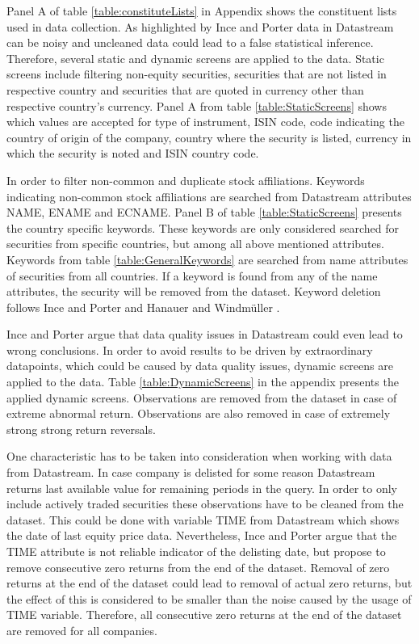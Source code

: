 \documentclass{article}
\begin{document}
Panel A of table \ref{table:constituteLists} in Appendix shows the constituent lists used in data collection. As highlighted by Ince and Porter \citeyear{Ince2006} data in Datastream can be noisy and uncleaned data could lead to a false statistical inference. Therefore, several static and dynamic screens are applied to the data. Static screens include filtering non-equity securities, securities that are not listed in respective country and securities that are quoted in currency other than respective country's currency. Panel A from table \ref{table:StaticScreens} shows which values are accepted for type of instrument, ISIN code, code indicating the country of origin of the company, country where the security is listed, currency in which the security is noted and ISIN country code. \par

In order to filter non-common and duplicate stock affiliations. Keywords indicating non-common stock affiliations are searched from Datastream attributes NAME, ENAME and ECNAME. Panel B of table \ref{table:StaticScreens} presents the country specific keywords. These keywords are only considered searched for securities from specific countries, but among all above mentioned attributes. Keywords from table \ref{table:GeneralKeywords} are searched from name attributes of securities from all countries. If a keyword is found from any of the name attributes, the security will be removed from the dataset. Keyword deletion follows Ince and Porter \citeyear{Ince2006} and Hanauer and Windmüller \citeyear{HANAUER2023106712}. \par

Ince and Porter \citeyear{Ince2006} argue that data quality issues in Datastream could even lead to wrong conclusions. In order to avoid results to be driven by extraordinary datapoints, which could be caused by data quality issues, dynamic screens are applied to the data. Table  \ref{table:DynamicScreens} in the appendix presents the applied dynamic screens. Observations are removed from the dataset in case of extreme abnormal return. Observations are also removed in case of extremely strong strong return reversals.\par

One characteristic has to be taken into consideration when working with data from Datastream. In case company is delisted for some reason Datastream returns last available value for remaining periods in the query. In order to only include actively traded securities these observations have to be cleaned from the dataset. This could be done with variable TIME from Datastream which shows the date of last equity price data. Nevertheless, Ince and Porter \citeyear{Ince2006} argue that the TIME attribute is not reliable indicator of the delisting date, but propose to remove consecutive zero returns from the end of the dataset. Removal of zero returns at the end of the dataset could lead to removal of actual zero returns, but the effect of this is considered to be smaller than the noise caused by the usage of TIME variable. Therefore, all consecutive zero returns at the end of the dataset are removed for all companies. \par
\end{document}

